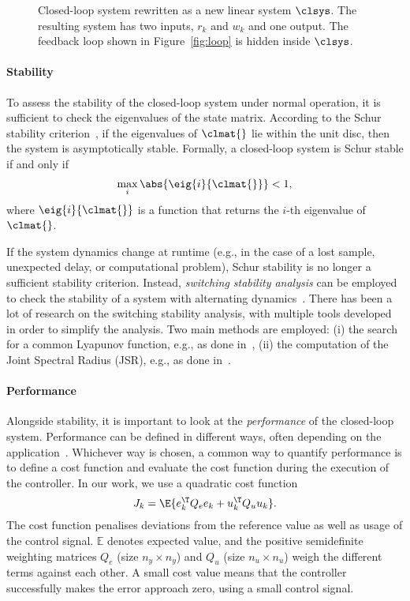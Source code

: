 \begin{figure}[t]
\centering

\caption{Closed-loop system rewritten as a new linear system $\clsys$.
    The resulting system has two inputs, $r_k$ and $w_k$ and one output.
    The feedback loop shown in Figure~\ref{fig:loop} is hidden inside $\clsys$.}
\label{fig:closedloop}
\end{figure}

\paragraph*{Stability}

To assess the stability of the closed-loop system under normal operation, it is sufficient to check the eigenvalues of the state matrix. 
According to the Schur stability criterion~\cite{Astrom:1997}, if the eigenvalues of $\clmat{}$ lie within the unit disc, then the system is asymptotically stable. 
Formally, a closed-loop system is Schur stable if and only if
%
\begin{equation}
    \label{eq:schur}
    \max_i{\abs{\eig{i}{\clmat{}}}} < 1,
\end{equation}
%
where $\eig{i}{\clmat{}}$ is a function that returns the $i$-th eigenvalue of~$\clmat{}$.

If the system dynamics change at runtime (e.g., in the case of a lost sample, unexpected delay, or computational problem), Schur stability is no longer a sufficient stability criterion.
Instead, \emph{switching stability analysis} can be employed to check the stability of a system with alternating dynamics~\cite{Jungers2009}.
There has been a lot of research on the switching stability analysis, with multiple tools developed in order to simplify the analysis.
Two main methods are employed: (i) the search for a common Lyapunov function, e.g., as done in~\cite{Linsenmayer:2017}, (ii) the computation of the Joint Spectral Radius (JSR), e.g., as done in~\cite{Maggio:2020,Jungers:2014}.

\paragraph*{Performance}

Alongside stability, it is important to look at the \emph{performance} of the closed-loop system.
Performance can be defined in different ways, often depending on the application~\cite{Astrom:2006}.
Whichever way is chosen, a common way to quantify performance is to define a cost function and evaluate the cost function during the execution of the controller.
In our work, we use a quadratic cost function
%
\begin{equation}
    \label{eq:cost}
    J_k = \E{e_k^\T Q_e e_k + u_k^\T Q_u u_k}.
\end{equation}
%
The cost function penalises deviations from the reference value as well as usage of the control signal.
$\mathbb{E}$ denotes expected value, and the positive semidefinite weighting matrices $Q_e$ (size $n_y \times n_y$) and $Q_u$ (size $n_u \times n_u$) weigh the different terms against each other.
A small cost value means that the controller successfully makes the error approach zero, using a small control signal.

